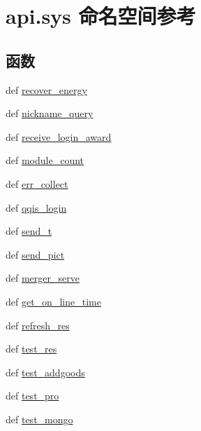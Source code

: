 \hypertarget{namespaceapi_1_1sys}{\section{api.\-sys 命名空间参考}
\label{namespaceapi_1_1sys}
}
\subsection*{函数}
\begin{DoxyCompactItemize}
\item 
def \hyperlink{namespaceapi_1_1sys_a4a80a092a67b2e55fe7cd1f7b927c68d}{recover\-\_\-energy}
\item 
def \hyperlink{namespaceapi_1_1sys_ab3d204940ebf91b91f8abdb0b2249350}{nickname\-\_\-query}
\item 
def \hyperlink{namespaceapi_1_1sys_a027dfd6a748fd345fabdaa8405a8b014}{receive\-\_\-login\-\_\-award}
\item 
def \hyperlink{namespaceapi_1_1sys_a983e14deadee6fd5aab739637c991caa}{module\-\_\-count}
\item 
def \hyperlink{namespaceapi_1_1sys_aeae2696ad1b78ae1a5a75140a9a0a338}{err\-\_\-collect}
\item 
def \hyperlink{namespaceapi_1_1sys_a8a41a9df8683463754021f3bd584e3d7}{qqis\-\_\-login}
\item 
def \hyperlink{namespaceapi_1_1sys_af7cecfeb6bada0ccad0d74c7f830b9ca}{send\-\_\-t}
\item 
def \hyperlink{namespaceapi_1_1sys_a7a89b8cedbee9110200d5e085608589d}{send\-\_\-pict}
\item 
def \hyperlink{namespaceapi_1_1sys_aea3709bc6b8e312a236a963ec89012ab}{merger\-\_\-serve}
\item 
def \hyperlink{namespaceapi_1_1sys_af33ac47cbd036c232485bc495acdfefc}{get\-\_\-on\-\_\-line\-\_\-time}
\item 
def \hyperlink{namespaceapi_1_1sys_a04c8318a641130f6b7a7a9723f4fe0d6}{refresh\-\_\-res}
\item 
def \hyperlink{namespaceapi_1_1sys_a0ec1e06a897e047ece794baa36462601}{test\-\_\-res}
\item 
def \hyperlink{namespaceapi_1_1sys_a2bd3c6c00951bce1441261ae95837ba5}{test\-\_\-addgoods}
\item 
def \hyperlink{namespaceapi_1_1sys_a6a8a8b5fb474a33bb085473997b936bf}{test\-\_\-pro}
\item 
def \hyperlink{namespaceapi_1_1sys_a8e5b3541699742a521c847458e9615f3}{test\-\_\-mongo}
\end{DoxyCompactItemize}
